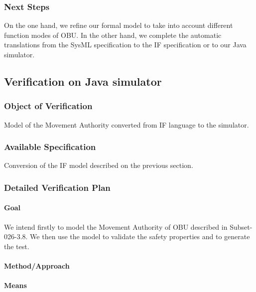 \documentclass{template/openetcs_article}
\begin{document}
\subsubsection{Next Steps}

On the one hand, we refine our formal model to take into account different
function modes of OBU.
In the other hand, we complete the automatic translations from the SysML
specification to the IF specification or to our Java simulator.

\subsection{Verification on Java simulator}

\subsubsection{Object of Verification}
Model of the Movement Authority converted from IF language to the simulator.

\subsubsection{Available Specification}
Conversion of the IF model described on the previous section.

\subsubsection{Detailed Verification Plan}

\paragraph{Goal} 
We intend firstly to model the Movement Authority of OBU described in
Subset-026-3.8. We then use the model to validate the safety
properties and to generate the test.

\paragraph{Method/Approach}

\paragraph{Means}
\end{document}
